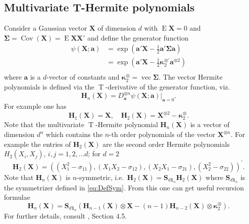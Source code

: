\hypertarget{multivariate-t-hermite-polynomials}{%
\subsection{Multivariate T-Hermite polynomials}\label{multivariate-t-hermite-polynomials}}

Consider a Gaussian vector \(\mathbf{X}\) of dimension \(d\) with \(\operatorname{E}\mathbf{X}=0\) and \(\mathbf{\Sigma}=\operatorname{Cov}(\mathbf{X})=\operatorname{E}\mathbf{X X}'\) and define the generator function
\begin{equation}
\begin{split}
\psi(\mathbf{X}; \mathbf{a})&=\exp \left(\mathbf{a}'\mathbf{X} - \frac{1}{2} \mathbf{a}' \mathbf{\Sigma} \mathbf{a}\right) \\
&=\exp \left(\mathbf{a}'\mathbf{X}  - \frac{1}{2} \boldsymbol{\kappa}_2^{\otimes\prime}  \mathbf{a}^{\otimes 2} \right) \\
\end{split}
\end{equation}
where \(\mathbf{a}\) is a \(d\)-vector of constants and \(\boldsymbol{\kappa}_2^{\otimes}=\operatorname{vec}\mathbf{\Sigma}\). The vector Hermite polynomials is defined via the \(\operatorname{T}\)-derivative of the generator function, viz.
\[
\mathbf{H}_n(\mathbf{X}) = D_\mathbf{a}^{\otimes n}\psi(\mathbf{X};\mathbf{a})\big|_{\mathbf{a}=0}.
\]
For example one has
\[
\mathbf{H}_1(\mathbf{X})=\mathbf{X},    \quad \mathbf{H}_2(\mathbf{X})=\mathbf{X}^{\otimes 2} - \boldsymbol{\kappa}_2^{\otimes}.
\]
Note that the multivariate \(\operatorname{T}\)-Hermite polynomial \(\mathbf{H}_n(\mathbf{X})\) is a vector of dimension \(d^n\) which contains the \(n\)-th order polynomials of the vector \(\mathbf{X}^{\otimes n}\). For example the entries of \(\mathbf{H}_2(\mathbf{X})\) are the second order Hermite polynomials \(H_2(X_i,X_j)\), \(i,j=1,2, \dots d\); for \(d=2\)
\[
\mathbf{H}_2(\mathbf{X}) = \left( (X_1^2 - \sigma_{11}), (X_1 X_2 - \sigma_{12}), (X_2 X_1 - \sigma_{21}), (X_2^2 - \sigma_{22})\right)^\prime.
\]
Note that \(\mathbf{H}_n(\mathbf{X})\) is \(n\)-symmetric, i.e.~\(\mathbf{H}_2(\mathbf{X}) = \mathbf{S}_{d \mathbf{1}_n} \mathbf{H}_2(\mathbf{X})\)
where \(\mathbf{S}_{d \mathbf{1}_n}\) is the symmetrizer defined in \eqref{eq:DefSym}. From this one can get useful recursion formulae
\begin{equation}
\mathbf{H}_n(\mathbf{X})=\mathbf{S}_{d \mathbf{1}_n}\left(  \mathbf{H}_{n-1}(\mathbf{X}) \otimes \mathbf{X}- (n-1) \mathbf{H}_{n-2}(\mathbf{X}) \otimes \boldsymbol{\kappa}_2^{\otimes} \right).
\label{eq:RecFHP}
\end{equation}
For further details, consult \citet{terdik2021multivariate}, Section 4.5.

